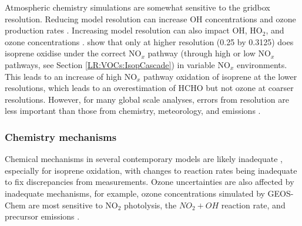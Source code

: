       Atmospheric chemistry simulations are somewhat sensitive to the gridbox resolution.
      Reducing model resolution can increase OH concentrations and ozone production rates \parencite{Wild2006}.
      Increasing model resolution can also impact OH, HO$_2$, and ozone concentrations \parencite[e.g.,][]{Christian2017}.
      \textcite{Yu2016} show that only at higher resolution (0.25 by 0.3125\degr) does isoprene oxidise under the correct NO$_x$ pathway (through high or low NO$_x$ pathways, see Section \ref{LR:VOCs:IsopCascade}) in variable NO$_x$ environments.
      This leads to an increase of high NO$_x$ pathway oxidation of isoprene at the lower resolutions, which leads to an overestimation of HCHO but not ozone at coarser resolutions.
      However, for many global scale analyses, errors from resolution are less important than those from chemistry, meteorology, and emissions \parencite{Christian2017, Christian2018}.
      
            
    \subsubsection{Chemistry mechanisms}
      \label{LR:Models:Uncert:Chemistry}
      
      
      Chemical mechanisms in several contemporary models are likely inadequate \parencite{Marvin2017}, especially for isoprene oxidation, with changes to reaction rates being inadequate to fix discrepancies from measurements.
      Ozone uncertainties are also affected by inadequate mechanisms, for example, ozone concentrations simulated by GEOS-Chem are most sensitive to NO$_2$ photolysis, the $NO_2 + OH$ reaction rate, and precursor emissions \parencite{Christian2017}.
      
      
